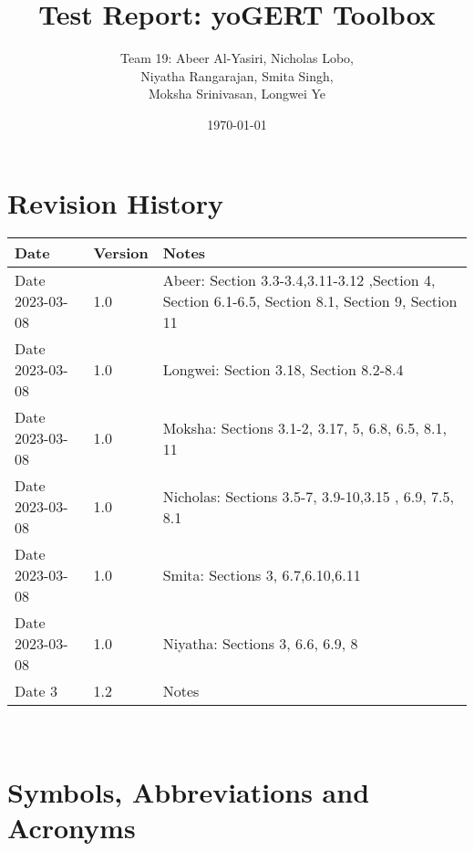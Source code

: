 \documentclass[12pt, titlepage]{article}
\begin{document}
\title{Test Report: yoGERT Toolbox} 

\author{Team 19: Abeer Al-Yasiri, Nicholas Lobo,\\ Niyatha Rangarajan, Smita Singh,\\ Moksha Srinivasan, Longwei Ye}
\date{\today}
	
\maketitle


\section{Revision History}

\begin{tabularx}{\textwidth}{p{3cm}p{2cm}X}
\toprule {\bf Date} & {\bf Version} & {\bf Notes}\\
\midrule
Date 2023-03-08 & 1.0 & Abeer: Section 3.3-3.4,3.11-3.12 ,Section 4, Section 6.1-6.5, Section 8.1, Section 9, Section 11 \\
Date 2023-03-08 & 1.0 & Longwei: Section 3.18, Section 8.2-8.4\\
Date 2023-03-08 & 1.0 & Moksha: Sections 3.1-2, 3.17, 5, 6.8, 6.5, 8.1, 11\\
Date 2023-03-08 & 1.0 & Nicholas: Sections 3.5-7, 3.9-10,3.15 , 6.9, 7.5, 8.1\\
Date 2023-03-08 & 1.0 & Smita: Sections 3, 6.7,6.10,6.11\\
Date 2023-03-08 & 1.0 & Niyatha: Sections 3, 6.6, 6.9, 8 \\
Date 3 & 1.2 & Notes\\
\bottomrule
\end{tabularx}
~\newpage

\section{Symbols, Abbreviations and Acronyms}

\end{document}
